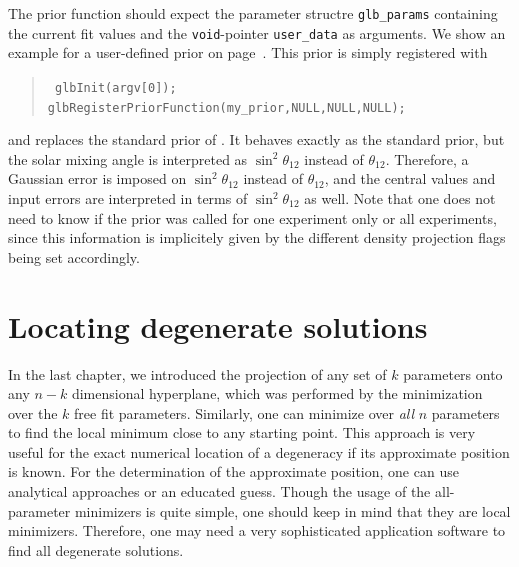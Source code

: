 The prior function should expect the parameter structre {\tt glb\_params} containing the
current fit values and the {\tt void}-pointer {\tt user\_data} as arguments.
We show an example for a user-defined prior on page~\pageref{ex:userprior}. This prior
is simply registered with
\begin{quote}
{\tt
 glbInit(argv[0]); \\
 glbRegisterPriorFunction(my\_prior,NULL,NULL,NULL);
}
\end{quote}
and replaces the standard prior of \GLOBES . It behaves exactly as the standard prior, but
the solar mixing angle is interpreted as $\sin^2 \theta_{12}$ instead of $\theta_{12}$. Therefore,
a Gaussian error is imposed on $\sin^2 \theta_{12}$ instead of $\theta_{12}$, and the central
values and input errors are interpreted in terms of $\sin^2 \theta_{12}$ as well. Note that
one does not need to know if the prior was called for one experiment only or all experiments,
since this information is implicitely given by the different density projection flags being set
accordingly. 

\chapter{Locating degenerate solutions}

In the last chapter, we introduced the projection of any set of $k$ parameters onto any $n-k$ dimensional hyperplane, which was performed by the minimization over the $k$ free fit parameters. Similarly, one can minimize over {\em all} $n$ parameters to find the local minimum close to any starting point. This approach is very useful for the exact numerical location of a degeneracy if its approximate position is known. For the determination of the approximate position, one can use analytical approaches or an educated guess. 
Though the usage of the all-parameter minimizers is quite simple, one should keep in mind that they are local minimizers. Therefore, one may need a very sophisticated application software to find all degenerate solutions.

